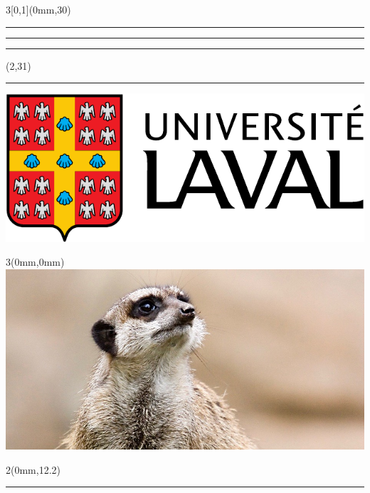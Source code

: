\begin{frame}[plain]
  \begin{textblock*}{3\TPHorizModule}[0,1](0mm,30\TPVertModule)
    \textcolor{rouge}{\rule{\banderougewidth}{\banderougeheight}}%
    \rule{\gapwidth}{0pt}%
    \textcolor{or}{\rule{\bandeorwidth}{\bandeorheight}}           %
  \end{textblock*}

  \begin{textblock*}{\TPHorizModule}(2\TPHorizModule,31\TPVertModule)
    \rule{\gapwidth}{0pt}%
    \includegraphics[height=\logoheight,keepaspectratio=true]{ul_p}
  \end{textblock*}

  \begin{textblock*}{3\TPHorizModule}(0mm,0mm)
    \includegraphics[width=\imagewidth,%
                     keepaspectratio=true]{Suricata-diapos.jpg}
  \end{textblock*}

  \begin{textblock*}{2\TPHorizModule}(0mm,12.2\TPVertModule)
    \textcolor{white}{\rule{\linewidth}{11\TPVertModule}}
  \end{textblock*}


\end{frame}
